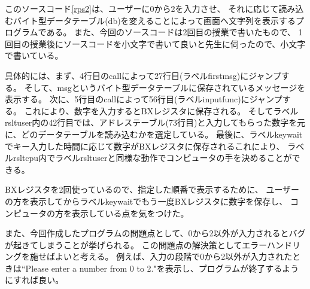 \documentclass[12pt]{jarticle}
\begin{document}
このソースコード\ref{rps2}は、ユーザーに0から2を入力させ、
それに応じて読み込むバイト型データテーブル(db)を変えることによって画面へ文字列を表示するプログラムである。
また、今回のソースコードは2回目の授業で書いたもので、
1回目の授業後にソースコードを小文字で書いて良いと先生に伺ったので、小文字で書いている。

具体的には、まず、4行目のcallによって27行目(ラベルfirstmsg)にジャンプする。
そして、msgというバイト型データテーブルに保存されているメッセージを表示する。
次に、5行目のcallによって56行目(ラベルinputfunc)にジャンプする。
これにより、数字を入力するとBXレジスタに保存される。
そしてラベルrsltuser内の42行目では、アドレステーブル(73行目)と入力してもらった数字を元に、どのデータテーブルを読み込むかを選定している。
最後に、ラベルkeywaitでキー入力した時間に応じて数字がBXレジスタに保存されるこれにより、
ラベルrsltcpu内でラベルrsltuserと同様な動作でコンピュータの手を決めることができる。

BXレジスタを2回使っているので、指定した順番で表示するために、
ユーザーの方を表示してからラベルkeywaitでもう一度BXレジスタに数字を保存し、
コンピュータの方を表示している点を気をつけた。

また、今回作成したプログラムの問題点として、0から2以外が入力されるとバグが起きてしまうことが挙げられる。
この問題点の解決策としてエラーハンドリングを施せばよいと考える。
例えば、入力の段階で0から2以外が入力されたときは``Please enter a number from 0 to 2."を表示し、プログラムが終了するようにすれば良い。
\end{document}
